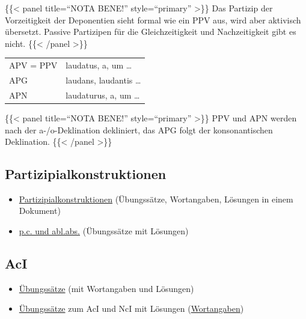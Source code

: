 \documentclass{scrartcl}
\begin{document}
\{\{< panel title="`NOTA BENE!"' style="`primary"' >\}\} Das Partizip der Vorzeitigkeit der Deponentien sieht formal wie ein PPV aus, wird aber aktivisch übersetzt. Passive Partizipen für die Gleichzeitigkeit und Nachzeitigkeit gibt es nicht. \{\{< /panel >\}\}

\begin{center}
\begin{tabular}{ll}
APV = PPV & laudatus, a, um \ldots{}\\
APG & laudans, laudantis \ldots{}\\
APN & laudaturus, a, um \ldots{}\\
\end{tabular}
\end{center}


\{\{< panel title="`NOTA BENE!"' style="`primary"' >\}\} PPV und APN werden nach der a-/o-Deklination dekliniert, das APG folgt der konsonantischen Deklination. \{\{< /panel >\}\}

\subsection{Partizipialkonstruktionen}
\label{sec:org2ab85f0}

\begin{itemize}
\item \href{https://www.dropbox.com/s/7hgaz2130uzlw0d/\%25C2\%25A746Partizipialkonstruktionen.pdf?dl=0}{Partizipialkonstruktionen} (Übungssätze, Wortangaben, Lösungen in
einem Dokument)
\item \href{https://www.dropbox.com/s/9uwdu2l7g1kr8gi/PC\_ablabs2.pdf?dl=0}{p.c. und abl.abs.} (Übungssätze mit Lösungen)
\end{itemize}

\subsection{AcI}
\label{sec:orgf577b27}

\begin{itemize}
\item \href{https://www.dropbox.com/s/p3vtu5snnd3z27r/AcI.pdf?dl=0}{Übungssätze} (mit Wortangaben und Lösungen)
\item \href{https://www.dropbox.com/s/4vx8vgcisfx9wll/AcI\_NcI.pdf?dl=0}{Übungssätze} zum AcI und NcI mit Lösungen (\href{https://www.dropbox.com/s/ef0rmrd1262svd3/Wortangaben\_AcI\_NcI.pdf?dl=0}{Wortangaben})
\end{itemize}
\end{document}
